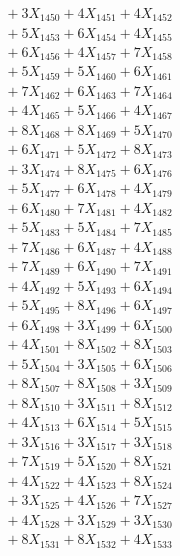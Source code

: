 \documentclass[a4paper,10pt]{article}
\begin{document}
{\begin{align}
&\;  + 3 X_{1450} + 4 X_{1451} + 4 X_{1452} \\[0.3ex]
&\;  + 5 X_{1453} + 6 X_{1454} + 4 X_{1455} \\[0.3ex]
&\;  + 6 X_{1456} + 4 X_{1457} + 7 X_{1458} \\[0.3ex]
&\;  + 5 X_{1459} + 5 X_{1460} + 6 X_{1461} \\[0.3ex]
&\;  + 7 X_{1462} + 6 X_{1463} + 7 X_{1464} \\[0.3ex]
&\;  + 4 X_{1465} + 5 X_{1466} + 4 X_{1467} \\[0.3ex]
&\;  + 8 X_{1468} + 8 X_{1469} + 5 X_{1470} \\[0.3ex]
&\;  + 6 X_{1471} + 5 X_{1472} + 8 X_{1473} \\[0.3ex]
&\;  + 3 X_{1474} + 8 X_{1475} + 6 X_{1476} \\[0.3ex]
&\;  + 5 X_{1477} + 6 X_{1478} + 4 X_{1479} \\[0.5ex]\allowbreak
&\;  + 6 X_{1480} + 7 X_{1481} + 4 X_{1482} \\[0.3ex]
&\;  + 5 X_{1483} + 5 X_{1484} + 7 X_{1485} \\[0.3ex]
&\;  + 7 X_{1486} + 6 X_{1487} + 4 X_{1488} \\[0.3ex]
&\;  + 7 X_{1489} + 6 X_{1490} + 7 X_{1491} \\[0.3ex]
&\;  + 4 X_{1492} + 5 X_{1493} + 6 X_{1494} \\[0.3ex]
&\;  + 5 X_{1495} + 8 X_{1496} + 6 X_{1497} \\[0.3ex]
&\;  + 6 X_{1498} + 3 X_{1499} + 6 X_{1500} \\[0.3ex]
&\;  + 4 X_{1501} + 8 X_{1502} + 8 X_{1503} \\[0.3ex]
&\;  + 5 X_{1504} + 3 X_{1505} + 6 X_{1506} \\[0.3ex]
&\;  + 8 X_{1507} + 8 X_{1508} + 3 X_{1509} \\[0.5ex]\allowbreak
&\;  + 8 X_{1510} + 3 X_{1511} + 8 X_{1512} \\[0.3ex]
&\;  + 4 X_{1513} + 6 X_{1514} + 5 X_{1515} \\[0.3ex]
&\;  + 3 X_{1516} + 3 X_{1517} + 3 X_{1518} \\[0.3ex]
&\;  + 7 X_{1519} + 5 X_{1520} + 8 X_{1521} \\[0.3ex]
&\;  + 4 X_{1522} + 4 X_{1523} + 8 X_{1524} \\[0.3ex]
&\;  + 3 X_{1525} + 4 X_{1526} + 7 X_{1527} \\[0.3ex]
&\;  + 4 X_{1528} + 3 X_{1529} + 3 X_{1530} \\[0.3ex]
&\;  + 8 X_{1531} + 8 X_{1532} + 4 X_{1533} \\[0.3ex]

\end{align}}
\end{document}
